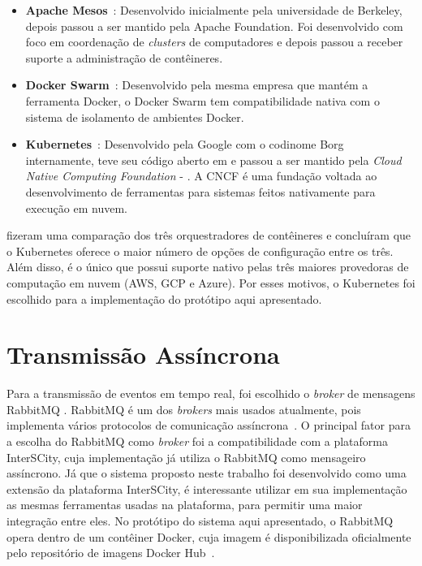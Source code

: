 \begin{itemize}
    \item \textbf{Apache Mesos}~\citep{Mesos}: Desenvolvido inicialmente pela universidade de Berkeley, depois passou a ser mantido pela Apache Foundation. Foi desenvolvido com foco em coordenação de \textit{clusters} de computadores e depois passou a receber suporte a administração de contêineres. %
    \item \textbf{Docker Swarm}~\cite{Swarm}: Desenvolvido pela mesma empresa que mantém a ferramenta Docker, o Docker Swarm tem compatibilidade nativa com o sistema de isolamento de ambientes Docker.
    \item \textbf{Kubernetes}~\citep{Kubernetes}: Desenvolvido pela Google com o codinome Borg internamente, teve seu código aberto em e passou a ser mantido pela \textit{Cloud Native Computing Foundation} - \cite{cnfc}. A CNCF é uma fundação voltada ao desenvolvimento de ferramentas para sistemas feitos nativamente para execução em nuvem.
\end{itemize}  
    
\cite{Truyen_2019} fizeram uma comparação dos três orquestradores de contêineres e concluíram que o Kubernetes oferece o maior número de opções de configuração entre os três. Além disso, é o único que possui suporte nativo pelas três maiores provedoras de computação em nuvem (AWS, GCP e Azure). Por esses motivos, o Kubernetes foi escolhido para a implementação do protótipo aqui apresentado.


\section{Transmissão Assíncrona}

Para a transmissão de eventos em tempo real, foi escolhido o \textit{broker} de mensagens RabbitMQ \citep{RabbitMq}. RabbitMQ é um dos \textit{brokers} mais usados atualmente, pois implementa vários protocolos de comunicação assíncrona~\citep{Dobbelaere:2017:KVR:3093742.3093908}. O principal fator para a escolha do RabbitMQ como \textit{broker} foi a compatibilidade com a plataforma InterSCity, cuja implementação já utiliza o RabbitMQ como mensageiro assíncrono. Já que o sistema proposto neste trabalho foi desenvolvido como uma extensão da plataforma InterSCity, é interessante utilizar em sua implementação as mesmas ferramentas usadas na plataforma, para permitir uma maior integração entre eles.
No protótipo do sistema aqui apresentado, o RabbitMQ opera dentro de um contêiner Docker, cuja imagem é disponibilizada oficialmente pelo repositório de imagens Docker Hub~\cite{Dockerhub}. 



